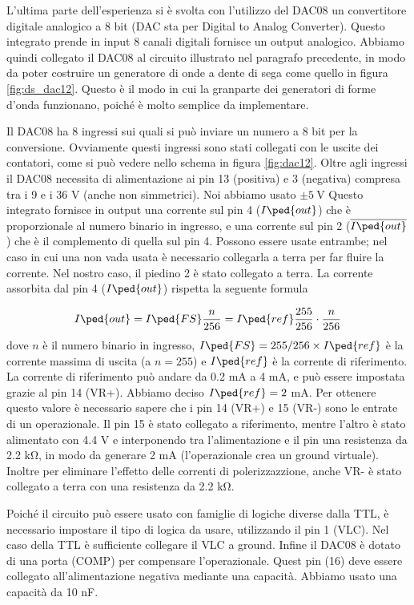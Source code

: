 L'ultima parte dell'esperienza si è svolta con l'utilizzo del DAC08 un convertitore digitale
analogico a 8 bit  (DAC sta per Digital to Analog Converter). Questo integrato prende in input 8 canali digitali
fornisce un output analogico. Abbiamo quindi collegato il DAC08 al circuito illustrato nel paragrafo precedente,
in modo da poter costruire un generatore di onde a dente di sega come quello in
figura \ref{fig:ds_dac12}. Questo è il modo in cui la granparte dei
generatori di forme d'onda funzionano, poiché è molto semplice da implementare.

Il DAC08 ha 8 ingressi sui quali si può inviare un numero a 8 bit per la conversione.
Ovviamente questi ingressi sono stati collegati con le uscite dei contatori, come si può vedere nello
schema in figura \ref{fig:dac12}.
Oltre agli ingressi il DAC08 necessita di alimentazione ai pin 13 (positiva)
e 3 (negativa) compresa tra i 9 e i 36 V (anche non simmetrici). Noi abbiamo usato $\pm \SI{5}{\volt}$ 
Questo integrato fornisce in output una corrente
sul pin 4 ($I\ped{out}$) che è proporzionale al numero binario in ingresso, e una corrente sul pin 2 ($\overline{I\ped{out}}$) che è il complemento
di quella sul pin 4. Possono essere usate entrambe; nel caso in cui una non vada usata è necessario collegarla
a terra per far fluire la corrente. Nel nostro caso, il piedino 2 è stato collegato a terra.
La corrente assorbita dal pin 4 ($I\ped{out}$) rispetta la seguente formula

\begin{equation}
	I\ped{out} = I\ped{FS} \frac{n}{256} = I\ped{ref} \frac{255}{256} \cdot \frac{n}{256}
\end{equation}
%
dove $n$ è il numero binario in ingresso, $I\ped{FS} = 255/256 \times I\ped{ref}$ è la corrente massima di uscita (a $n = 255$)
e $I\ped{ref}$ è la corrente di riferimento. La corrente di riferimento può andare da 0.2 mA a 4 mA, e può essere impostata
grazie al pin 14 (VR+). Abbiamo deciso $I\ped{ref} = 2$ mA. Per ottenere questo valore è necessario sapere che
i pin 14 (VR+) e 15 (VR-) sono le entrate di un operazionale. Il pin 15 è stato collegato a riferimento, mentre l'altro è stato alimentato
con 4.4 V e interponendo tra l'alimentazione e il pin una resistenza da 2.2 \si{\kilo\ohm}, in modo da generare 2 mA (l'operazionale crea un
ground virtuale). Inoltre per eliminare l'effetto delle correnti di polerizzazzione, anche VR- è stato collegato a terra con una resistenza
da 2.2 \si{\kilo\ohm}.

Poiché il circuito può essere usato con famiglie di logiche diverse dalla TTL, è necessario impostare
il tipo di logica da usare, utilizzando il pin 1 (VLC). Nel caso della TTL è sufficiente collegare il VLC a ground.
Infine il DAC08 è dotato di una porta (COMP) per compensare l'operazionale. Quest pin (16) deve essere collegato all'alimentazione negativa
mediante una capacità. Abbiamo usato una capacità da 10 nF.

